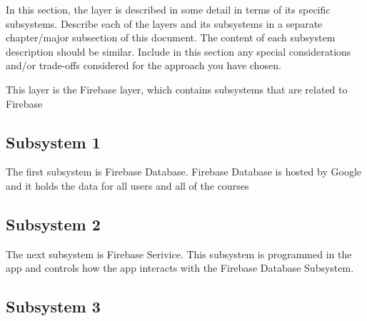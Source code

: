 In this section, the layer is described in some detail in terms of its specific subsystems. Describe each of the layers and its subsystems in a separate chapter/major subsection of this document. The content of each subsystem description should be similar. Include in this section any special considerations and/or trade-offs considered for the approach you have chosen.

This layer is the Firebase layer, which contains subsystems that are related to Firebase

\subsection{Subsystem 1}

The first subsystem is Firebase Database. Firebase Database is hosted by Google and it holds the data for all users and all of the courses


\subsection{Subsystem 2}

The next subsystem is Firebase Serivice. This subsystem is programmed in the app and controls how the app interacts with the Firebase Database Subsystem.


\subsection{Subsystem 3}

